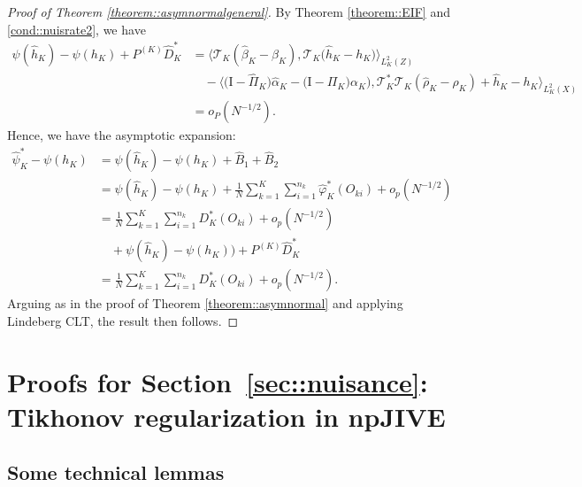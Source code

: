 \documentclass[11pt]{article}
\theoremstyle{plain}
\theoremstyle{definition}
\theoremstyle{remark}
\theoremstyle{definition}
\begin{document}
\begin{proof}[Proof of Theorem  \ref{theorem::asymnormalgeneral}]
By Theorem \ref{theorem::EIF} and \ref{cond::nuisrate2}, we have
\begin{align*}
    \psi(\widehat{h}_{K}) - \psi(h_K) + P^{(K)} \widehat{D}_{K}^* 
    &= \big   \langle   \mathcal{T}_K(\widehat{\beta}_K - \beta_K) ,   \mathcal{T}_{K} \big( \widehat{h}_K - h_K \big)  \big \rangle_{L^2_K(Z)}   \\
    & \quad - \big \langle   \big( \text{I} - \widehat{\Pi}_K \big) \widehat{\alpha}_{K} - \big( \text{I} - \Pi_{K} \big) \alpha_K \big),   \mathcal{T}_{K}^*  \mathcal{T}_K(\widehat{\rho}_K - \rho_K)  +  \widehat{h}_K - h_K   \big  \rangle_{L^2_K(X)} \\
    &= o_P(N^{-1/2}).
\end{align*}
Hence, we have the asymptotic expansion:
\begin{align*}
    \widehat{\psi}^*_K- \psi(h_K)  &=    \psi(\widehat{h}_{K})  - \psi(h_K) +  \widehat{B}_1 +   \widehat{B}_2 \\
    &= \psi(\widehat{h}_{K})  - \psi(h_K) + \frac{1}{N}   \sum_{k=1}^K \sum_{i=1}^{n_k} \widehat{\varphi}_K^*(O_{ki})  + o_p(N^{-1/2})\\
  &  = \frac{1}{N}   \sum_{k=1}^K \sum_{i=1}^{n_k}D_K^*(O_{ki}) + o_p(N^{-1/2}) \\
      & \quad + \psi(\widehat{h}_{K}) - \psi(h_K))   + P^{(K)} \widehat{D}_{K}^* \\
       &  = \frac{1}{N}   \sum_{k=1}^K \sum_{i=1}^{n_k}D_K^*(O_{ki}) + o_p(N^{-1/2}).
\end{align*}
Arguing as in the proof of Theorem \ref{theorem::asymnormal} and applying Lindeberg CLT, the result then follows.
 

\end{proof}

  
 \section{Proofs for Section~\ref{sec::nuisance}: Tikhonov regularization in npJIVE}

\subsection{Some technical lemmas}

 

 
\end{document}
